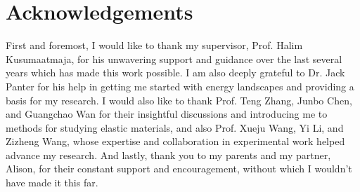 \chapter*{Acknowledgements}
First and foremost, I would like to thank my supervisor, Prof. Halim Kusumaatmaja, for his unwavering support and guidance over the last several years which has made this work possible.
I am also deeply grateful to Dr. Jack Panter for his help in getting me started with energy landscapes and providing a basis for my research.
I would also like to thank Prof. Teng Zhang, Junbo Chen, and Guangchao Wan for their insightful discussions and introducing me to methods for studying elastic materials,
and also Prof. Xueju Wang, Yi Li, and Zizheng Wang, whose expertise and collaboration in experimental work helped advance my research.
And lastly, thank you to my parents and my partner, Alison, for their constant support and encouragement, without which I wouldn't have made it this far.


\hypertarget{toc}{}
\begingroup
\singlespacing
\tableofcontents
\endgroup

